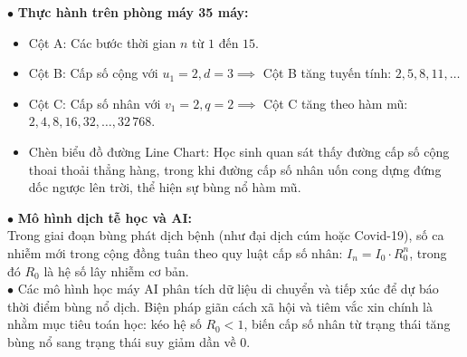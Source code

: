 \documentclass[12pt, a4paper]{article}
\begin{document}
\begin{pedabox}
    $\bullet$ \textbf{Thực hành trên phòng máy 35 máy:}
    \begin{itemize}
        \item Cột A: Các bước thời gian $n$ từ $1$ đến $15$.
        \item Cột B: Cấp số cộng với $u_1 = 2, d = 3 \implies$ Cột B tăng tuyến tính: $2, 5, 8, 11, \dots$
        \item Cột C: Cấp số nhân với $v_1 = 2, q = 2 \implies$ Cột C tăng theo hàm mũ: $2, 4, 8, 16, 32, \dots, 32\,768$.
        \item Chèn biểu đồ đường Line Chart: Học sinh quan sát thấy đường cấp số cộng thoai thoải thẳng hàng, trong khi đường cấp số nhân uốn cong dựng đứng dốc ngược lên trời, thể hiện sự bùng nổ hàm mũ.
    \end{itemize}
\end{pedabox}


\begin{aibox}
    $\bullet$ \textbf{Mô hình dịch tễ học và AI:}\\
    Trong giai đoạn bùng phát dịch bệnh (như đại dịch cúm hoặc Covid-19), số ca nhiễm mới trong cộng đồng tuân theo quy luật cấp số nhân: $I_n = I_0 \cdot R_0^n$, trong đó $R_0$ là hệ số lây nhiễm cơ bản.\\
    $\bullet$ Các mô hình học máy AI phân tích dữ liệu di chuyển và tiếp xúc để dự báo thời điểm bùng nổ dịch. Biện pháp giãn cách xã hội và tiêm vắc xin chính là nhằm mục tiêu toán học: kéo hệ số $R_0 < 1$, biến cấp số nhân từ trạng thái tăng bùng nổ sang trạng thái suy giảm dần về $0$.
\end{aibox}
\end{document}
